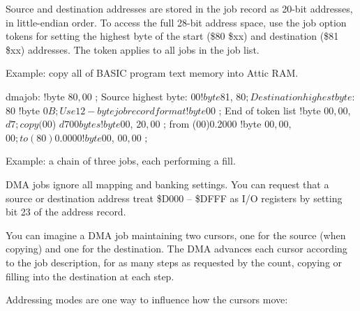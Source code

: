 Source and destination addresses are stored in the job record as 20-bit addresses, in little-endian order. To access the full 28-bit address space, use the job option tokens for setting the highest byte of the start (\$80 \$xx) and destination (\$81 \$xx) addresses. The token applies to all jobs in the job list.

Example: copy all of BASIC program text memory into Attic RAM.

\begin{asmcode}
dmajob:
!byte $80, $00       ; Source highest byte: $00
!byte $81, $80       ; Destination highest byte: $80
!byte $0B            ; Use 12-byte job record format
!byte $00            ; End of token list
!byte $00, $00, $d7  ; copy ($00) $d700 bytes
!byte $00, $20, $00  ; from (00)0.2000
!byte $00, $00, $00  ; to (80)0.0000
!byte $00, $00, $00  ;
\end{asmcode}

Example: a chain of three jobs, each performing a fill.


DMA jobs ignore all mapping and banking settings. You can request that a source or destination address treat \$D000 -- \$DFFF as I/O registers by setting bit 23 of the address record.

You can imagine a DMA job maintaining two cursors, one for the source (when copying) and one for the destination. The DMA advances each cursor according to the job description, for as many steps as requested by the count, copying or filling into the destination at each step.

Addressing modes are one way to influence how the cursors move:

